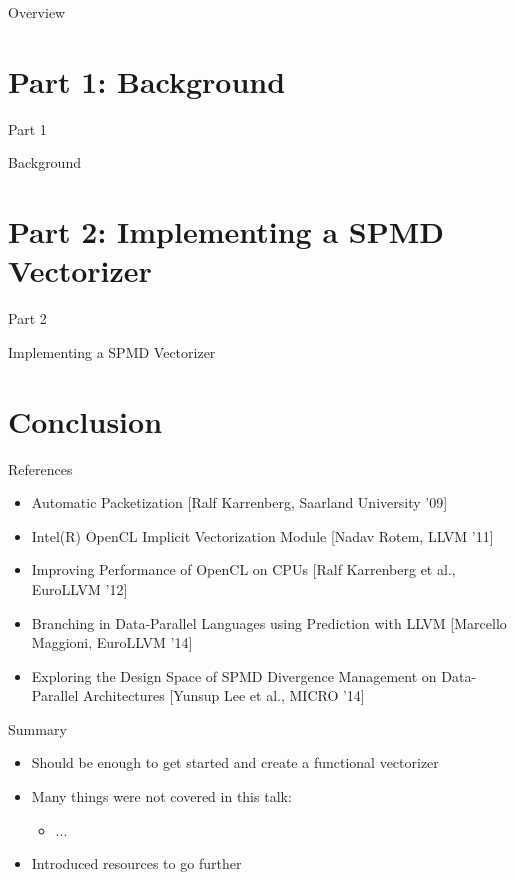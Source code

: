 \documentclass[t,aspectratio=169]{beamer}
\newcommand{\talkpart}[2]{%
\section{Part #1: #2}

\begin{frame}[c]{Part #1}

\vspace{1cm}
\centerline{\LARGE{#2}}

\end{frame}}
\begin{document}

\begin{frame}{Overview}
\tableofcontents
\end{frame}


\talkpart{1}{Background}


\talkpart{2}{Implementing a SPMD Vectorizer}



%

%


\section*{Conclusion}

\begin{frame}{References}

\begin{itemize}
    \item Automatic Packetization [Ralf Karrenberg, Saarland University '09]
    \item Intel(R) OpenCL Implicit Vectorization Module [Nadav Rotem, LLVM '11]
    \item Improving Performance of OpenCL on CPUs [Ralf Karrenberg et al., EuroLLVM '12]
    \item Branching in Data-Parallel Languages using Prediction with LLVM [Marcello Maggioni, EuroLLVM '14]
    \item Exploring the Design Space of SPMD Divergence Management on Data-Parallel Architectures [Yunsup Lee et al., MICRO '14]
\end{itemize}

\end{frame}


\begin{frame}{Summary}

\begin{itemize}
    \item Should be enough to get started and create a functional vectorizer
    \item Many things were not covered in this talk:
    \begin{itemize}
        \item ...
    \end{itemize}
    \item Introduced resources to go further
\end{itemize}

\end{frame}
\end{document}
